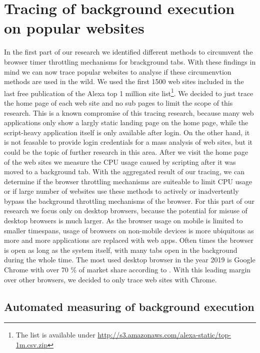 \documentclass[
	ruledheaders=section,%
	class=report,%
	thesis={type=bachelor},%
	accentcolor=9c,%
	custommargins=true,%
	marginpar=false,%
	parskip=half-,%
	fontsize=11pt,%
]{tudapub}
\begin{document}
  \newpage
  \chapter{Tracing of background execution on popular websites}
  \label{chap:tracing}

  In the first part of our research we identified different methods to circumvent the browser timer throttling mechanisms for brackground tabs. With these findings in mind we can now trace popular websites to analyse if these circumenvtion methods are used in the wild. We used the first 1500 web sites included in the last free publication of the Alexa top 1 million site list\footnote{The list is available under \url{http://s3.amazonaws.com/alexa-static/top-1m.csv.zip}}. We decided to just trace the home page of each web site and no sub pages to limit the scope of this research. This is a known compromise of this tracing research, because many web applications only show a largly static landing page on the home page, while the script-heavy application itself is only available after login. On the other hand, it is not feasable to provide login credentials for a mass analysis of web sites, but it could be the topic of further research in this area. After we visit the home page of the web sites we measure the CPU usage caused by scripting after it was moved to a background tab. With the aggregated result of our tracing, we can determine if the browser throttling mechanisms are suiteable to limit CPU usage or if large number of websites use these methods to actively or inadvertently bypass the background throttling mechanisms of the browser. For this part of our research we focus only on desktop browsers, because the potential for misuse of desktop browsers is much larger. As the browser usage on mobile is limited to smaller timespans, usage of browsers on non-mobile devices is more ubiquitous as more and more applications are replaced with web apps. Often times the browser is open as long as the system itself, with many tabs open in the background during the whole time. The most used desktop browser in the year 2019 is Google Chrome with over 70 \% of market share according to \cite{statcounter-desktop-browser-market-share}. With this leading margin over other browsers, we decided to only trace web sites with Chrome.
  
  \section{Automated measuring of background execution}
\end{document}
